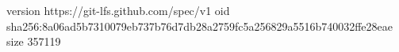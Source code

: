 version https://git-lfs.github.com/spec/v1
oid sha256:8a06ad5b7310079eb737b76d7db28a2759fc5a256829a5516b740032ffe28eae
size 357119
